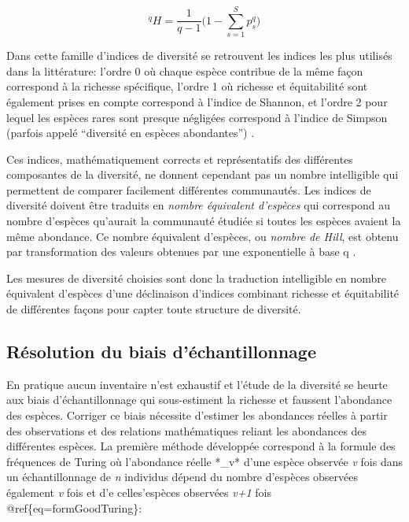 \documentclass[
  11pt,
  french,
  A4paper,
  extrafontsizes,onecolumn,openright
  ]{memoir}
\begin{document}
\begin{equation}
{^{q}H=\frac{1}{q-1}\Bigg(1-\displaystyle\sum_{s=1}^{S}p^q_s\Bigg) }
\label{eq:formHCDT}
\end{equation}

Dans cette famille d'indices de diversité se retrouvent les indices les
plus utilisés dans la littérature: l'ordre 0 où chaque espèce contribue
de la même façon correspond à la richesse spécifique, l'ordre 1 où
richesse et équitabilité sont également prises en compte correspond à
l'indice de Shannon, et l'ordre 2 pour lequel les espèces rares sont
presque négligées correspond à l'indice de Simpson (parfois appelé
``diversité en espèces abondantes'')
\autocites{Shannon1948}{Simpson1949}{Patil1982}{Tothmeresz1995}.

Ces indices, mathématiquement corrects et représentatifs des différentes
composantes de la diversité, ne donnent cependant pas un nombre
intelligible qui permettent de comparer facilement différentes
communautés. Les indices de diversité doivent être traduits en
\emph{nombre équivalent d'espèces} qui correspond au nombre d'espèces
qu'aurait la communauté étudiée si toutes les espèces avaient la même
abondance. Ce nombre équivalent d'espèces, ou \emph{nombre de Hill}, est
obtenu par transformation des valeurs obtenues par une exponentielle à
base q \autocite{Hill1973}.

Les mesures de diversité choisies sont donc la traduction intelligible
en nombre équivalent d'espèces d'une déclinaison d'indices combinant
richesse et équitabilité de différentes façons pour capter toute
structure de diversité.

\subsection{Résolution du biais
d'échantillonnage}\label{resolution-du-biais-dechantillonnage}

En pratique aucun inventaire n'est exhaustif et l'étude de la diversité
se heurte aux biais d'échantillonnage qui sous-estiment la richesse et
faussent l'abondance des espèces. Corriger ce biais nécessite d'estimer
les abondances réelles à partir des observations et des relations
mathématiques reliant les abondances des différentes espèces. La
première méthode développée correspond à la formule des fréquences de
Turing \autocite{Good1953} où l'abondance réelle *\alpha\_v* d'une
espèce observée \emph{v} fois dans un échantillonnage de \emph{n}
individus dépend du nombre d'espèces observées également \emph{v} fois
et d'e celles'espèces observées \emph{v+1} fois
@ref\{eq=formGoodTuring\}:
\end{document}
